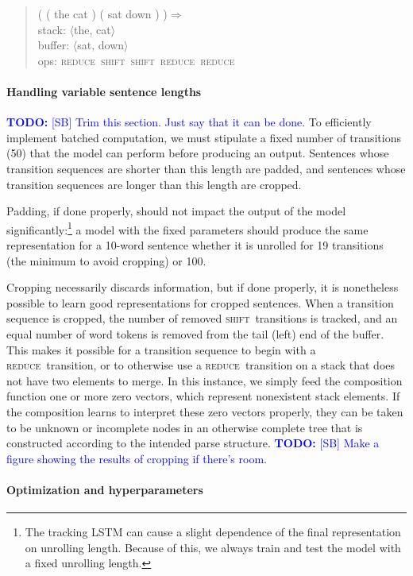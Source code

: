 \documentclass[11pt]{article}
\newcommand\todo[1]{\textcolor{blue}{\textbf{TODO:} #1}}
\newcommand{\shift}{\textsc{shift}}
\newcommand{\reduce}{\textsc{reduce}}
\begin{document}
\begin{quote}\small
( ( the cat ) ( sat down ) )$\Rightarrow$ \\
stack: $\langle$the, cat$\rangle$\\
buffer: $\langle$sat, down$\rangle$\\
ops: \reduce~\shift~\shift~\reduce~\reduce
\end{quote}

\paragraph{Handling variable sentence lengths}

\todo{[SB] Trim this section. Just say that it can be done.}
To efficiently implement batched computation, we must stipulate a fixed number of transitions (50) that the model can perform before producing an output. Sentences whose transition sequences are shorter than this length are padded, and sentences whose transition sequences are longer than this length are cropped. 

Padding, if done properly, should not impact the output of the model significantly:\footnote{The tracking LSTM can cause a slight dependence of the final representation on unrolling length. Because of this, we always train and test the model with a fixed unrolling length.} a model with the fixed parameters should produce the same representation for a 10-word sentence whether it is unrolled for 19 transitions (the minimum to avoid cropping) or 100.

Cropping necessarily discards information, but if done properly, it is nonetheless possible to learn good representations for cropped sentences. When a transition sequence is cropped, the number of removed \shift~transitions is tracked, and an equal number of word tokens is removed from the tail (left) end of the buffer. This makes it possible for a transition sequence to begin with a \reduce~transition, or to otherwise use a \reduce~transition on a stack that does not have two elements to merge. In this instance, we simply feed the composition function one or more zero vectors, which represent nonexistent stack elements. If the composition learns to interpret these zero vectors properly, they can be taken to be unknown or incomplete nodes in an otherwise complete tree that is constructed according to the intended parse structure. \todo{[SB] Make a figure showing the results of cropping if there's room.}

\paragraph{Optimization and hyperparameters}
\end{document}
